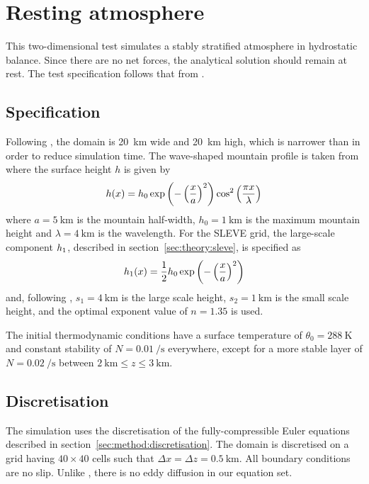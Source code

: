 \section{Resting atmosphere}
\label{sec:resting}

This two-dimensional test simulates a stably stratified atmosphere in hydrostatic balance.  Since there are no net forces, the analytical solution should remain at rest.  The test specification follows that from \textcite{klemp2011}.  

\subsection{Specification}
Following \textcite{weller-shahrokhi2014}, the domain is \SI{20}{\kilo\meter} wide and \SI{20}{\kilo\meter} high, which is narrower than \textcite{klemp2011} in order to reduce simulation time.  The wave-shaped mountain profile is taken from \textcite{schaer2002} where the surface height $h$ is given by
\begin{align}
h(x) = h_0 \exp \left( - \left( \frac{x}{a} \right)^2 \right) \cos^2 \left( \frac{\pi x}{\lambda} \right)
\end{align}
where $a = \SI{5}{\kilo\meter}$ is the mountain half-width, $h_0 = \SI{1}{\kilo\meter}$ is the maximum mountain height and $\lambda = \SI{4}{\kilo\meter}$ is the wavelength.  For the SLEVE grid, the large-scale component $h_1$, described in section~\ref{sec:theory:sleve}, is specified as
\begin{align}
h_1(x) = \frac{1}{2} h_0 \exp \left( - \left( \frac{x}{a} \right)^2 \right)
\end{align}
and, following \cite{leuenberger2010}, $s_1 = \SI{4}{\kilo\meter}$ is the large scale height, $s_2 = \SI{1}{\kilo\meter}$ is the small scale height, and the optimal exponent value of $n = 1.35$ is used.

The initial thermodynamic conditions have a surface temperature of $\theta_0 = \SI{288}{\kelvin}$ and constant stability of $N = \SI{0.01}{\per\second}$ everywhere, except for a more stable layer of $N = \SI{0.02}{\per\second}$ between $\SI{2}{\kilo\meter} \leq z \leq \SI{3}{\kilo\meter}$.

\subsection{Discretisation}
The simulation uses the discretisation of the fully-compressible Euler equations described in section~\ref{sec:method:discretisation}.  The domain is discretised on a grid having $40 \times 40$ cells such that $\Delta x = \Delta z = \SI{0.5}{\kilo\meter}$.  All boundary conditions are no slip.  Unlike \textcite{klemp2011}, there is no eddy diffusion in our equation set.

